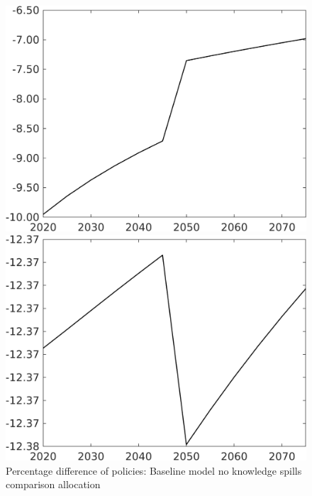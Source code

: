 \documentclass[12pt]{article}
\begin{document}
\begin{figure}[h!!]
	\centering
	\caption{Percentage difference of policies: Baseline model no knowledge spills comparison allocation}\label{fig:Pertauf_nsk0_xgr0_noknow}
	\begin{minipage}[]{0.32\textwidth}
		\includegraphics[width=1\textwidth]{../../codding_model/own_basedOnFried/optimalPol_010922_revision/figures/all_13Sept22/CompTaufPER_bytaul_Reg0_tauf_spillover0_nsk0_xgr0_knspil1_sep1_LFlimit1_emsbase0_countec0_GovRev0_etaa0.79_lgd0.png}
	\end{minipage}		
	\begin{minipage}[]{0.32\textwidth}
		\includegraphics[width=1\textwidth]{../../codding_model/own_basedOnFried/optimalPol_010922_revision/figures/all_13Sept22/CompTaufPER_bytaul_Reg0_hh_spillover0_nsk0_xgr0_knspil1_sep1_LFlimit1_emsbase0_countec0_GovRev0_etaa0.79_lgd0.png}

\end{minipage}
\end{figure}
\end{document}
